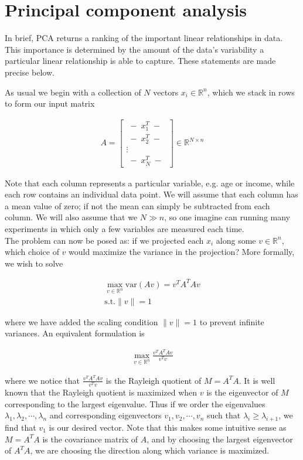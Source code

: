 \section{Principal component analysis\label{sec:ml:pca}}

In brief, PCA returns a ranking of the important linear relationships
in data. This importance is determined by the amount of the data's
variability a particular linear relationship is able to capture. These
statements are made precise below.

As usual we begin with a collection of $N$ vectors $x_i \in \mathbb{R}^n$,
which we stack in rows to form our input matrix

\begin{align}
  A = \begin{bmatrix} \; - \; x_1^T \; - \; \\ \; - \; x_2^T \; - \; \\ \vdots \\ \; - \; x_N^T
    \; - \; \end{bmatrix} \in \mathbb{R}^{N \times n}
\end{align}

Note that each column represents a particular variable, e.g. age or
income, while each row contains an individual data point. We will
assume that each column has a mean value of zero; if not the mean can
simply be subtracted from each column. We will also assume that we
$N \gg n$, so one imagine can running many experiments in which only a
few variables are measured each time. \\

The problem can now be posed
as: if we projected each $x_i$ along some $v \in \mathbb{R}^n$, which
choice of $v$ would maximize the variance in the projection? More
formally, we wish to solve

\begin{align}
  \max_{v \in \mathbb{R}^n} \mathrm{var}(Av) = v^TA^TAv \\
  \mathrm{s.t.} \| v \| = 1
\end{align}

where we have added the scaling condition $\| v \| = 1$ to prevent
infinite variances. An equivalent formulation is 

\begin{align}
  \max_{v \in \mathbb{R}^n} \frac{v^TA^TAv}{v^Tv}
\end{align}

where we notice that $\frac{v^TA^TAv}{v^Tv}$ is the Rayleigh quotient
of $M = A^TA$. It is well known that the Rayleigh quotient is
maximized when $v$ is the eigenvector of $M$ corresponding to the
largest eigenvalue. Thus if we order the eigenvalues
$\lambda_1, \lambda_2, \cdots, \lambda_n$ and corresponding
eigenvectors $v_1, v_2, \cdots, v_n$ such that
$\lambda_i \ge \lambda_{i+1}$, we find that $v_1$ is our desired
vector. Note that this makes some intuitive sense as $M = A^TA$ is the
covariance matrix of $A$, and by choosing the largest eigenvector of
$A^TA$, we are choosing the direction along which variance is
maximized. \\

